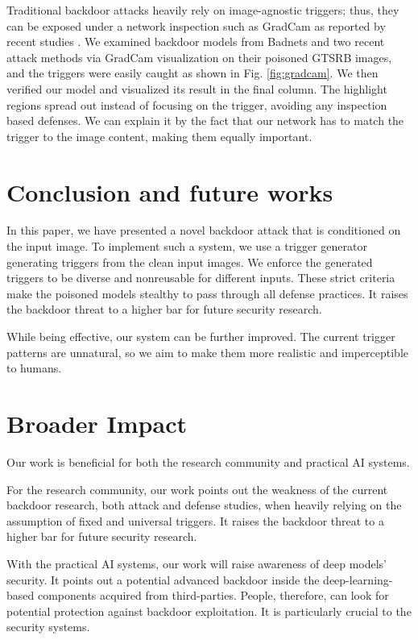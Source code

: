 Traditional backdoor attacks heavily rely on image-agnostic triggers; thus, they can be exposed under a network inspection such as GradCam \cite{selvaraju2017grad} as reported by recent studies \cite{Cheng2019,Doan2019Aug}. We examined backdoor models from Badnets and two recent attack methods \cite{ji2019programmable,salem2020dynamic} via GradCam visualization on their poisoned GTSRB images, and the triggers were easily caught as shown in Fig. \ref{fig:gradcam}. We then verified our model and visualized its result in the final column. The highlight regions spread out instead of focusing on the trigger, avoiding any inspection based defenses. We can explain it by the fact that our network has to match the trigger to the image content, making them equally important. 

\section{Conclusion and future works}
In this paper, we have presented a novel backdoor attack that is conditioned on the input image. To implement such a system, we use a trigger generator generating triggers from the clean input images. We enforce the generated triggers to be diverse and nonreusable for different inputs. These strict criteria make the poisoned models stealthy to pass through all defense practices. It raises the backdoor threat to a higher bar for future security research. 

While being effective, our system can be further improved. The current trigger patterns are unnatural, so we aim to make them more realistic and imperceptible to humans.

\section*{Broader Impact}
Our work is beneficial for both the research community and practical AI systems. 

For the research community, our work points out the weakness of the current backdoor research, both attack and defense studies, when heavily relying on the assumption of fixed and universal triggers. It raises the backdoor threat to a higher bar for future security research.

With the practical AI systems, our work will raise awareness of deep models' security. It points out a potential advanced backdoor inside the deep-learning-based components acquired from third-parties. People, therefore, can look for potential protection against backdoor exploitation. It is particularly crucial to the security systems.

